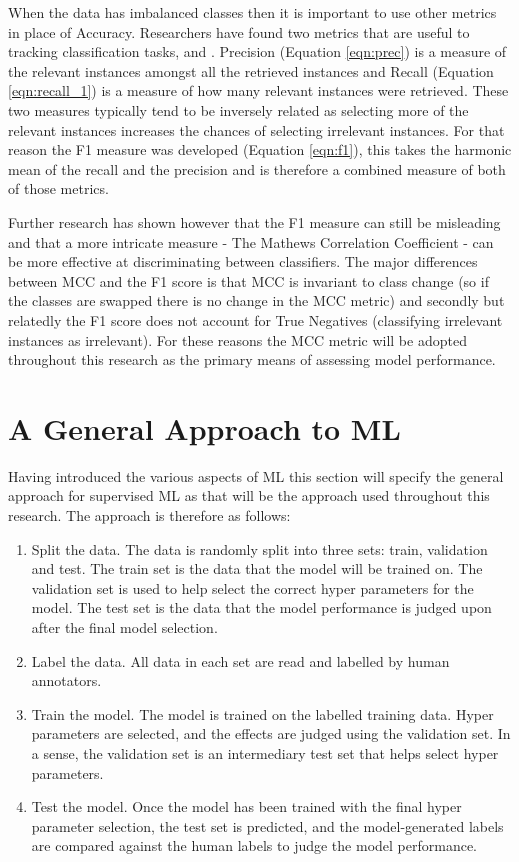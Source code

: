 When the data has imbalanced classes then it is important to use other metrics in place of Accuracy. Researchers have found two metrics that are useful to tracking classification tasks,  and  \parencite[Chapter~5]{witten_frank_hall_pal_2017}. Precision (Equation \ref{eqn:prec}) is a measure of the relevant instances amongst all the retrieved instances and Recall (Equation \ref{eqn:recall_1}) is a measure of how many relevant instances were retrieved. These two measures typically tend to be inversely related as selecting more of the relevant instances increases the chances of selecting irrelevant instances. For that reason the F1 measure was developed (Equation \ref{eqn:f1}), this takes the harmonic mean of the recall and the precision and is therefore a combined measure of both of those metrics. 

Further research \parencite{chicco2020advantages} has shown however that the F1 measure can still be misleading and that a more intricate measure - The Mathews Correlation Coefficient - can be more effective at discriminating between classifiers. The major differences between MCC and the F1 score is that MCC is invariant to class change (so if the classes are swapped there is no change in the MCC metric) and secondly but relatedly the F1 score does not account for True Negatives (classifying irrelevant instances as irrelevant).  For these reasons the MCC metric will be adopted throughout this research as the primary means of assessing model performance. 
 

\section{A General Approach to ML} Having introduced the various aspects of ML this section will specify the general approach for supervised ML as that will be the approach used throughout this research. The approach is therefore as follows:

\begin{enumerate}
\item{Split the data.} The data is randomly split into three sets: train, validation and test. The train set is the data that the model will be trained on. The validation set is used to help select the correct hyper parameters for the model. The test set is the data that the model performance is judged upon after the final model selection.
\item{Label the data.} All data in each set are read and labelled by human annotators.
\item{Train the model.} The model is trained on the labelled training data. Hyper parameters are selected, and the effects are judged using the validation set. In a sense, the validation set is an intermediary test set that helps select hyper parameters.
\item{Test the model.} Once the model has been trained with the final hyper parameter selection, the test set is predicted, and the model-generated labels are compared against the human labels to judge the model performance.
\end{enumerate}

